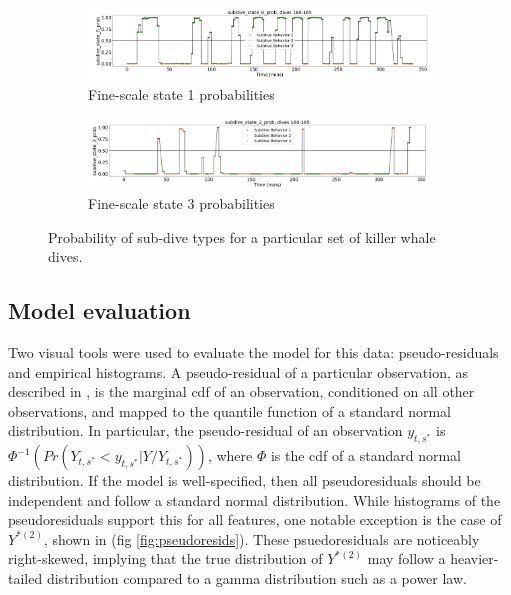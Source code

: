 \begin{figure}[h!]
	\centering
	\begin{subfigure}[t]{1.0\textwidth}
        \centering
        \includegraphics[width=5in]{../Plots/Fine_state_probs_1.png}
        \caption{Fine-scale state 1 probabilities}
    \end{subfigure}
    \newline
    \begin{subfigure}[t]{1.0\textwidth}
        \centering
        \includegraphics[width=5in]{../Plots/Fine_state_probs_3.png}
        \caption{Fine-scale state 3 probabilities}
    \end{subfigure}
	\caption{Probability of sub-dive types for a particular set of killer whale dives.}
	\label{fig:fine_probs}
\end{figure}

\subsection{Model evaluation}

Two visual tools were used to evaluate the model for this data: pseudo-residuals and empirical histograms. A pseudo-residual of a particular observation, as described in \cite{Zucchini:2016}, is the marginal cdf of an observation, conditioned on all other observations, and mapped to the quantile function of a standard normal distribution. In particular, the pseudo-residual of an observation $y_{t,s^*}$ is $\Phi^{-1} \left(Pr(Y_{t,s^*} < y_{t,s^*}|Y/Y_{t,s^*}) \right)$, where $\Phi$ is the cdf of a standard normal distribution. If the model is well-specified, then all pseudoresiduals should be independent and follow a standard normal distribution. While histograms of the pseudoresiduals support this for all features, one notable exception is the case of $Y^{*(2)}$, shown in (fig \ref{fig:pseudoresids}). These psuedoresiduals are noticeably right-skewed, implying that the true distribution of $Y^{*(2)}$ may follow a heavier-tailed distribution compared to a gamma distribution such as a power law. 


